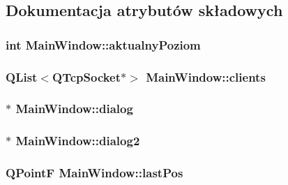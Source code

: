 \subsection{Dokumentacja atrybutów składowych}
\hypertarget{classMainWindow_aeff57fcdb7d82d6f69b1214ce24d1ecd}{
\subsubsection[{aktualny\-Poziom}]{\setlength{\rightskip}{0pt plus 5cm}int Main\-Window\-::aktualny\-Poziom\hspace{0.3cm}{\ttfamily [private]}}}\label{classMainWindow_aeff57fcdb7d82d6f69b1214ce24d1ecd}
\hypertarget{classMainWindow_a698f52eb8759a1cde60c5638670b078e}{
\subsubsection[{clients}]{\setlength{\rightskip}{0pt plus 5cm}Q\-List$<$Q\-Tcp\-Socket$\ast$$>$ Main\-Window\-::clients\hspace{0.3cm}{\ttfamily [private]}}}\label{classMainWindow_a698f52eb8759a1cde60c5638670b078e}
\hypertarget{classMainWindow_a029f5f35facf7120bbf42e54dbd25a40}{
\subsubsection[{dialog}]{$\ast$ Main\-Window\-::dialog\hspace{0.3cm}{\ttfamily [private]}}}\label{classMainWindow_a029f5f35facf7120bbf42e54dbd25a40}
\hypertarget{classMainWindow_acca874ff840ec87fe90e0acc72d40e5a}{
\subsubsection[{dialog2}]{$\ast$ Main\-Window\-::dialog2\hspace{0.3cm}{\ttfamily [private]}}}\label{classMainWindow_acca874ff840ec87fe90e0acc72d40e5a}
\hypertarget{classMainWindow_a479094513b0598030f63a24963e2109e}{
\subsubsection[{last\-Pos}]{\setlength{\rightskip}{0pt plus 5cm}Q\-Point\-F Main\-Window\-::last\-Pos\hspace{0.3cm}{\ttfamily [private]}}}\label{classMainWindow_a479094513b0598030f63a24963e2109e}

